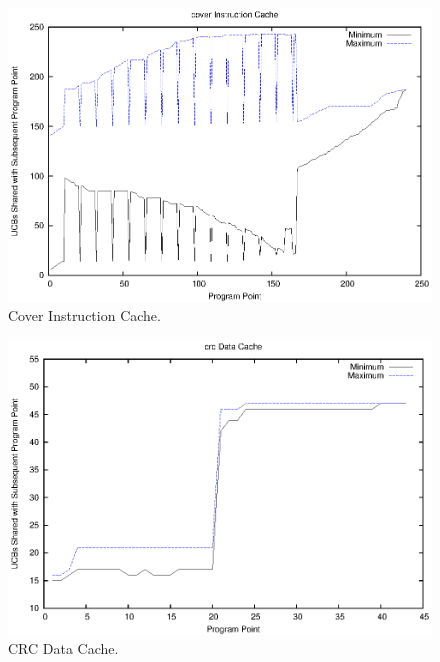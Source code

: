 \begin{figure}[h!]
\begin{center}
\includegraphics[width=\linewidth]{eps/cover-icache.eps}
\caption{Cover Instruction Cache.}
\label{fig:cover_instruction_cache}
\end{center}
\end{figure}
%
\vspace{-20pt}
\begin{figure}[h!]
\begin{center}
\includegraphics[width=\linewidth]{eps/crc-dcache.eps}
\caption{CRC Data Cache.}
\label{fig:crc_data_cache}
\end{center}
\end{figure}
%
\vspace{-20pt}

